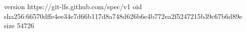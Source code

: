 version https://git-lfs.github.com/spec/v1
oid sha256:66570dffe4ee34e7d66b117d8a748d626b6e4b772ea2f5247215b39c67b6d89e
size 54726
